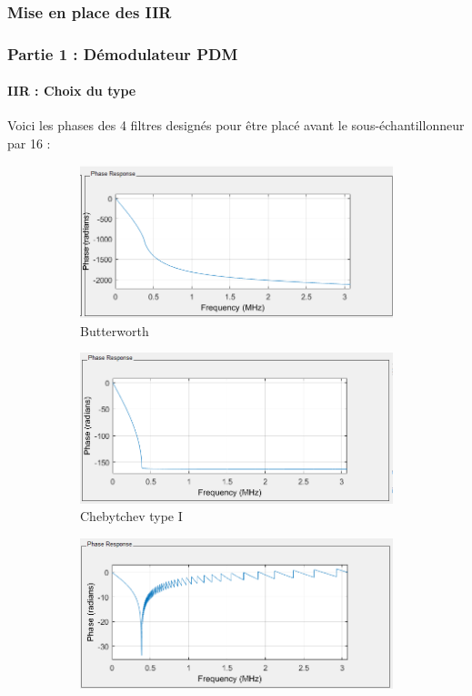 \documentclass[
10pt,
aspectratio=169,
]{beamer}
\begin{document}
\subsubsection{Mise en place des IIR}
\begin{frame}
\frametitle{Partie 1 : Démodulateur PDM} 
\framesubtitle{IIR : Choix du type} 
Voici les phases des 4 filtres designés pour être placé avant le sous-échantillonneur par 16 : 
\begin{figure}
\centering
\begin{subfigure}{0.4\textwidth}
    \includegraphics[scale=0.3]{Images/Phase_IIR_butterworth.PNG}
    \caption{Butterworth}
    \label{fig:butt}
\end{subfigure}
\hfill
\begin{subfigure}{0.4\textwidth}
    \includegraphics[scale=0.3]{Images/Phase_IIR_cheby_1.PNG}
    \caption{Chebytchev type I}
    \label{fig:cheb1}
\end{subfigure}
\hfill
\begin{subfigure}{0.4\textwidth}
    \includegraphics[scale=0.3]{Images/Phase_IIR_cheby_2.PNG}

\end{subfigure}
\end{figure}
\end{frame}
\end{document}
